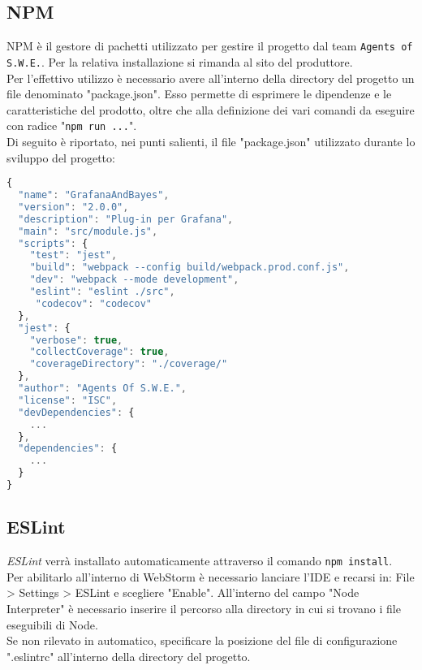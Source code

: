 \subsection{NPM}\label{npm}
NPM è il gestore di pachetti utilizzato per gestire il progetto dal team \texttt{Agents of S.W.E.}. Per la relativa installazione si rimanda al sito del produttore.\\
Per l'effettivo utilizzo è necessario avere all'interno della directory del progetto un file denominato "package.json". Esso permette di esprimere le dipendenze e le caratteristiche del prodotto, oltre che alla definizione dei vari comandi da eseguire con radice "\texttt{npm run ...}".\\
Di seguito è riportato, nei punti salienti, il file "package.json" utilizzato durante lo sviluppo del progetto:\\
\begin{lstlisting}[language=JavaScript]
{
  "name": "GrafanaAndBayes",
  "version": "2.0.0",
  "description": "Plug-in per Grafana",
  "main": "src/module.js",
  "scripts": {
    "test": "jest",
    "build": "webpack --config build/webpack.prod.conf.js",
    "dev": "webpack --mode development",
    "eslint": "eslint ./src",
     "codecov": "codecov"
  },
  "jest": {
    "verbose": true,
    "collectCoverage": true,
    "coverageDirectory": "./coverage/"
  },
  "author": "Agents Of S.W.E.",
  "license": "ISC",
  "devDependencies": {
    ...
  },
  "dependencies": {
    ...
  }
}
\end{lstlisting}

\subsection{ESLint}\label{eslint}
\textit{ESLint} verrà installato automaticamente attraverso il comando \texttt{npm install}.\\
Per abilitarlo all'interno di WebStorm è necessario lanciare l'IDE e recarsi in: File > Settings > ESLint e scegliere "Enable". All'interno del campo "Node Interpreter" è necessario inserire il percorso alla directory in cui si trovano i file eseguibili di Node.\\
Se non rilevato in automatico, specificare la posizione del file di configurazione ".eslintrc" all'interno della directory del progetto.

